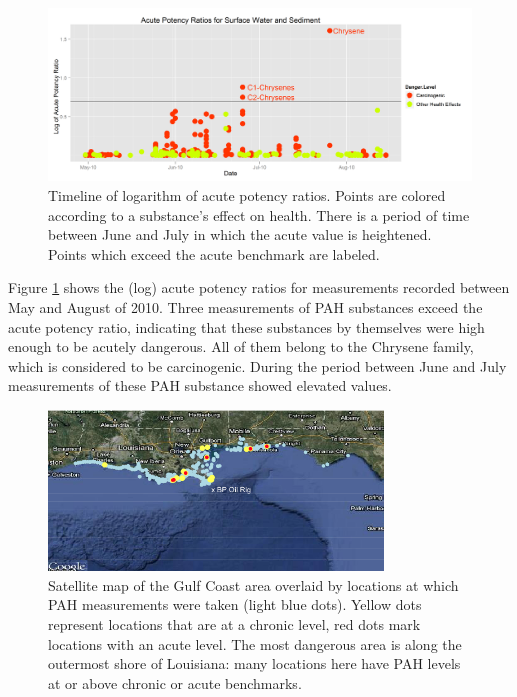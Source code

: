 \documentclass[authoryear,12pt]{elsarticle}
\begin{document}
\begin{figure}[htbp] %
   \centering
   \includegraphics[width=5in]{acute-timeline3.png} 
   \caption{Timeline of logarithm of acute potency ratios.  Points are colored according to a substance's effect on health. There is a period of time between June and July in which the acute value is heightened.  Points which exceed the acute benchmark are labeled.}
   \label{pah-timeline}
\end{figure}


Figure \ref {pah-timeline} shows the (log) acute potency ratios  for measurements recorded between May and August of 2010. Three measurements of PAH substances exceed the acute potency ratio, indicating that these substances by themselves were high enough to be acutely dangerous. All of them belong to the Chrysene family, which  is considered to be carcinogenic. During the  period between June and July  measurements of these PAH substance showed elevated values.

\begin{figure}[htbp] %
   \centering
   \includegraphics[width=3.5in]{chron-acute-map.png} 
   \caption{Satellite map of the Gulf Coast area overlaid by locations at which PAH measurements were taken (light blue dots). Yellow dots represent locations that are at a chronic level, red dots mark locations with an acute level.  The most dangerous area is along the outermost shore of Louisiana: many locations here have PAH levels at or above chronic or acute benchmarks.}
   \label{pah-map}
\end{figure}
\end{document}
